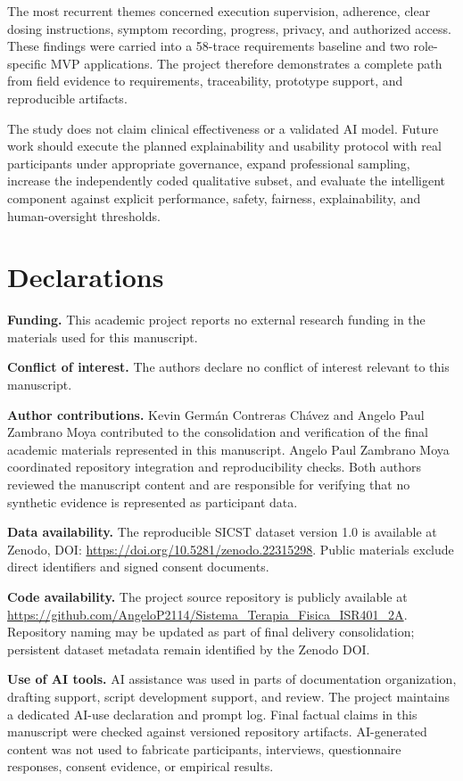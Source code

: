 \documentclass[10pt,a4paper]{article}
\begin{document}
The most recurrent themes concerned execution supervision, adherence, clear dosing instructions, symptom recording, progress, privacy, and authorized access. These findings were carried into a 58-trace requirements baseline and two role-specific MVP applications. The project therefore demonstrates a complete path from field evidence to requirements, traceability, prototype support, and reproducible artifacts.

The study does not claim clinical effectiveness or a validated AI model. Future work should execute the planned explainability and usability protocol with real participants under appropriate governance, expand professional sampling, increase the independently coded qualitative subset, and evaluate the intelligent component against explicit performance, safety, fairness, explainability, and human-oversight thresholds.

\section*{Declarations}
\textbf{Funding.} This academic project reports no external research funding in the materials used for this manuscript.

\textbf{Conflict of interest.} The authors declare no conflict of interest relevant to this manuscript.

\textbf{Author contributions.} Kevin Germán Contreras Chávez and Angelo Paul Zambrano Moya contributed to the consolidation and verification of the final academic materials represented in this manuscript. Angelo Paul Zambrano Moya coordinated repository integration and reproducibility checks. Both authors reviewed the manuscript content and are responsible for verifying that no synthetic evidence is represented as participant data.

\textbf{Data availability.} The reproducible SICST dataset version 1.0 is available at Zenodo, DOI: \url{https://doi.org/10.5281/zenodo.22315298}. Public materials exclude direct identifiers and signed consent documents.

\textbf{Code availability.} The project source repository is publicly available at \url{https://github.com/AngeloP2114/Sistema_Terapia_Fisica_ISR401_2A}. Repository naming may be updated as part of final delivery consolidation; persistent dataset metadata remain identified by the Zenodo DOI.

\textbf{Use of AI tools.} AI assistance was used in parts of documentation organization, drafting support, script development support, and review. The project maintains a dedicated AI-use declaration and prompt log. Final factual claims in this manuscript were checked against versioned repository artifacts. AI-generated content was not used to fabricate participants, interviews, questionnaire responses, consent evidence, or empirical results.



\end{document}
